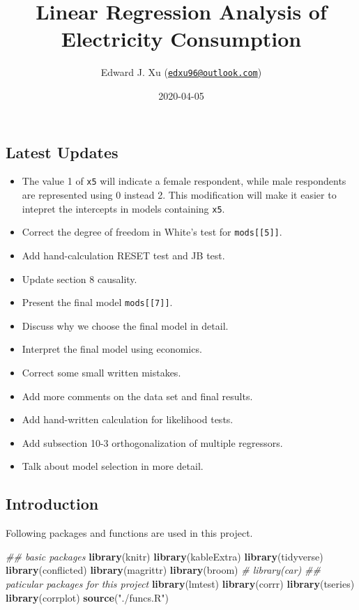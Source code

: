\documentclass[a4paper]{article}
\title{Linear Regression Analysis of Electricity Consumption}
\author{Edward J. Xu
(\href{mailto:edxu96@outlook.com}{\nolinkurl{edxu96@outlook.com}})}
\date{2020-04-05}
\newenvironment{Shaded}{\begin{snugshade}}{\end{snugshade}}
\newcommand{\CommentTok}[1]{\textcolor[rgb]{0.56,0.35,0.01}{\textit{#1}}}
\newcommand{\KeywordTok}[1]{\textcolor[rgb]{0.13,0.29,0.53}{\textbf{#1}}}
\newcommand{\NormalTok}[1]{#1}
\newcommand{\StringTok}[1]{\textcolor[rgb]{0.31,0.60,0.02}{#1}}
\providecommand{\tightlist}{%
  \setlength{\itemsep}{0pt}\setlength{\parskip}{0pt}}
\begin{document}
\maketitle

\hypertarget{latest-updates}{%
\subsection{Latest Updates}\label{latest-updates}}

\begin{itemize}
\tightlist
\item
  The value 1 of \texttt{x5} will indicate a female respondent, while
  male respondents are represented using 0 instead 2. This modification
  will make it easier to intepret the intercepts in models containing
  \texttt{x5}.
\item
  Correct the degree of freedom in White's test for
  \texttt{mods{[}{[}5{]}{]}}.
\item
  Add hand-calculation RESET test and JB test.
\item
  Update section 8 causality.
\item
  Present the final model \texttt{mods{[}{[}7{]}{]}}.
\item
  Discuss why we choose the final model in detail.
\item
  Interpret the final model using economics.
\item
  Correct some small written mistakes.
\item
  Add more comments on the data set and final results.
\item
  Add hand-written calculation for likelihood tests.
\item
  Add subsection 10-3 orthogonalization of multiple regressors.
\item
  Talk about model selection in more detail.
\end{itemize}

\hypertarget{introduction}{%
\subsection{Introduction}\label{introduction}}

Following packages and functions are used in this project.

\begin{Shaded}
\begin{Highlighting}[]
\CommentTok{## basic packages}
\KeywordTok{library}\NormalTok{(knitr)}
\KeywordTok{library}\NormalTok{(kableExtra)}
\KeywordTok{library}\NormalTok{(tidyverse)}
\KeywordTok{library}\NormalTok{(conflicted)}
\KeywordTok{library}\NormalTok{(magrittr)}
\KeywordTok{library}\NormalTok{(broom)}
\CommentTok{# library(car)}
\CommentTok{## paticular packages for this project}
\KeywordTok{library}\NormalTok{(lmtest)}
\KeywordTok{library}\NormalTok{(corrr)}
\KeywordTok{library}\NormalTok{(tseries)}
\KeywordTok{library}\NormalTok{(corrplot)}
\KeywordTok{source}\NormalTok{(}\StringTok{"./funcs.R"}\NormalTok{)}
\end{Highlighting}
\end{Shaded}
\end{document}
